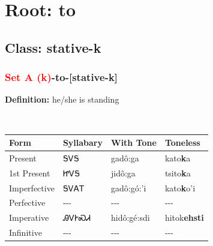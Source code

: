 \needspace{4in}
\section*{Root: to}
\nopagebreak
{}
\needspace{3in}
\subsection*{Class: stative-k}
\nopagebreak
\needspace{2in}
\subsubsection*{\textcolor{Red}{Set A (k)}{-}\textbf{to}{-}[stative-k]}
\nopagebreak
\textbf{Definition: } he/she is standing
\\[0.5em]
\begin{tabularx}{\textwidth}{l X X X}%
\toprule%
\textbf{Form}&\textbf{Syllabary}&\textbf{With Tone}&\textbf{Toneless}\\%
\midrule%
Present&ᎦᏙᎦ&gadô:ga&kato\textbf{k}a\\%
1st Present&ᏥᏙᎦ&jidô:ga&tsito\textbf{k}a\\%
Imperfective&ᎦᏙᎪᎢ&gadô:gó:’i&kato\textbf{k}o'i\\%
Perfective&{-}{-}{-}&{-}{-}{-}&{-}{-}{-}\\%
Imperative&ᎯᏙᎨᏍᏗ&hidô:gé:sdi&hitok\textbf{ehsti}\\%
Infinitive&{-}{-}{-}&{-}{-}{-}&{-}{-}{-}\\%
\bottomrule%
\end{tabularx}
\\[1em]
